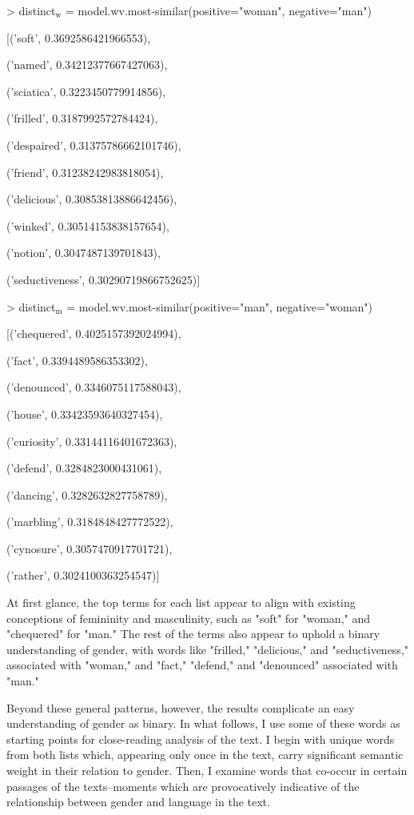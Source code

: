 \documentclass[11pt]{article}
\begin{document}
\begin{SOURCE}
> distinct\(_{\text{w}}\) = model.wv.most-similar(positive="woman", negative="man")

[('soft', 0.3692586421966553),

('named', 0.34212377667427063),

('sciatica', 0.3223450779914856),

('frilled', 0.3187992572784424),

('despaired', 0.31375786662101746),

('friend', 0.31238242983818054),

('delicious', 0.30853813886642456),

('winked', 0.30514153838157654),

('notion', 0.3047487139701843),

('seductiveness', 0.30290719866752625)]


> distinct\(_{\text{m}}\) = model.wv.most-similar(positive="man", negative="woman")

[('chequered', 0.4025157392024994),

('fact', 0.3394489586353302),

('denounced', 0.3346075117588043),

('house', 0.33423593640327454),

('curiosity', 0.33144116401672363),

('defend', 0.3284823000431061),

('dancing', 0.3282632827758789),

('marbling', 0.3184848427772522),

('cynosure', 0.3057470917701721),

('rather', 0.3024100363254547)]
\end{SOURCE}

At first glance, the top terms for each list appear to align with
existing conceptions of femininity and masculinity, such as "soft" for
"woman," and "chequered" for "man."  The rest of the terms also appear
to uphold a binary understanding of gender, with words like "frilled,"
"delicious," and "seductiveness," associated with "woman," and "fact,"
"defend," and "denounced" associated with "man."

Beyond these general patterns, however, the results complicate an easy
understanding of gender as binary. In what follows, I use some of
these words as starting points for close-reading analysis of the
text. I begin with unique words from both lists which, appearing only
once in the text, carry significant semantic weight in their relation
to gender. Then, I examine words that co-occur in certain passages of
the texts--moments which are provocatively indicative of the
relationship between gender and language in the text.
\end{document}
